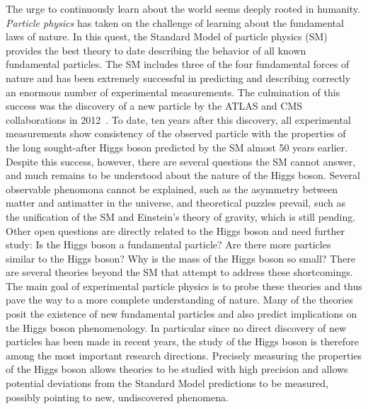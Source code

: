 
The urge to continuously learn about the world seems deeply rooted in humanity.
\emph{Particle physics} has taken on the challenge of learning about the fundamental laws of nature. 
In this quest, the Standard Model of particle physics (SM) provides the best theory to date describing the behavior of all known fundamental particles. 
The SM includes three of the four fundamental forces of nature and has been extremely successful in predicting and describing correctly an enormous number of experimental measurements. 
The culmination of this success was the discovery of a new particle by the ATLAS and CMS collaborations in 2012~\cite{HIGG-2012-27,CMS-HIG-12-028}.
To date, ten years after this discovery, all experimental measurements show consistency of the observed particle with the properties of the long sought-after Higgs boson predicted by the SM almost 50 years earlier.
Despite this success, however, there are several questions the SM cannot answer, and much remains to be understood about the nature of the Higgs boson.
Several observable phenomona cannot be explained, such as the asymmetry between matter and antimatter in the universe, and theoretical puzzles prevail, such as the unification of the SM and Einstein's theory of gravity, which is still pending.
Other open questions are directly related to the Higgs boson and need further study: Is the Higgs boson a fundamental particle? Are there more particles similar to the Higgs boson? Why is the mass of the Higgs boson so small? 
There are several theories beyond the SM that attempt to address these shortcomings. 
The main goal of experimental particle physics is to probe these theories and thus pave the way to a more complete understanding of nature.
Many of the theories posit the existence of new fundamental particles and also predict implications on the Higgs boson phenomenology.
In particular since no direct discovery of new particles has been made in recent years, the study of the Higgs boson is therefore among the most important research directions. 
Precisely measuring the properties of the Higgs boson allows theories to be studied with high precision and allows potential deviations from the Standard Model predictions to be measured, possibly pointing to new, undiscovered phenomena. 

